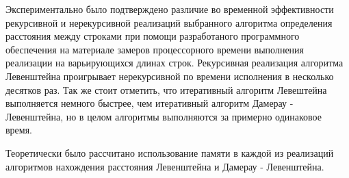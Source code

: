 \documentclass[12pt]{report}
\begin{document}
	Экспериментально было подтверждено различие во временной эффективности рекурсивной и нерекурсивной реализаций выбранного алгоритма определения расстояния между строками при помощи разработаного программного обеспечения на материале замеров процессорного времени выполнения реализации на варьирующихся длинах строк. Рекурсивная реализация алгоритма Левенштейна проигрывает нерекурсивной по времени исполнения в несколько десятков раз. Так же стоит отметить, что итеративный алгоритм Левештейна выполняется немного быстрее, чем итеративный алгоритм Дамерау - Левенштейна, но в целом алгоритмы выполняются за примерно одинаковое время.
	
	Теоретически было рассчитано использование памяти в каждой из реализаций алгоритмов нахождения расстояния Левенштейна и Дамерау - Левенштейна.
	
	
	
	
\end{document}
